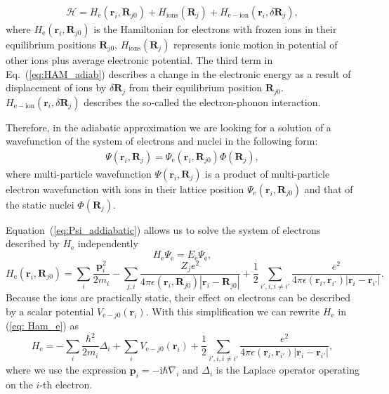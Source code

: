 \begin{eqnarray}
\mathcal{H}=H_\mathrm{e}\left(\mathbf{r}_i,\mathbf{R}_{j0}\right)+H_{\mathrm{ions}}\left(\mathbf{R}_j\right)+H_{\mathrm{e-ion}}\left(\mathbf{r}_i,\delta\mathbf{R}_{j}\right),\label{eq:HAM_adiab}
\end{eqnarray}
%
where $H_\mathrm{e}\left(\mathbf{r}_i,\mathbf{R}_{j0}\right)$ is the Hamiltonian for electrons with frozen ions in their equilibrium positions $\mathbf{R}_{j0}$, $H_{\mathrm{ions}}\left(\mathbf{R}_j\right)$ represents ionic motion in potential of other ions plus average electronic potential. The third term in Eq.~(\ref{eq:HAM_adiab}) describes a change in the electronic energy as a result of displacement of ions by $\delta\mathbf{R}_{j}$ from their equilibrium position $\mathbf{R}_{j0}$. $H_{\mathrm{e-ion}}\left(\mathbf{r}_i,\delta\mathbf{R}_{j}\right)$ describes the so-called the electron-phonon interaction.

Therefore, in the adiabatic approximation we are looking for a solution of a wavefunction of the system of electrons and nuclei in the following form:
%
\begin{eqnarray}
\Psi\left(\mathbf{r}_i, \mathbf{R}_{j}\right)=\Psi_\mathrm{e}\left(\mathbf{r}_i,\mathbf{R}_{j0}\right)\Phi\left(\mathbf{R}_j\right),\label{eq:Psi_addiabatic}
\end{eqnarray}
%
where multi-particle wavefunction $\Psi\left(\mathbf{r}_i, \mathbf{R}_{j}\right)$ is a product of multi-particle electron wavefunction with ions in their lattice position $\Psi_\mathrm{e}\left(\mathbf{r}_i,\mathbf{R}_{j0}\right)$ and that of the static nuclei $\Phi\left(\mathbf{R}_j\right)$.

Equation~(\ref{eq:Psi_addiabatic}) allows us to solve the system of electrons described by $H_\mathrm{e}$ independently
\begin{equation}
H_\mathrm{e}\Psi_\mathrm{e}=E_\mathrm{e}\Psi_\mathrm{e},
\end{equation}
\begin{equation}
H_\mathrm{e}\left(\mathbf{r}_i,\mathbf{R}_{j0}\right)=\sum_{i} \frac{\mathbf{p}_i^2}{2m_i}- \sum_{j, i} \frac{Z_j e^2}{4\pi \epsilon(\mathbf{r}_i, \mathbf{R}_{j0}) |\mathbf{r}_i-\mathbf{R}_{j0}|} + \frac{1}{2}\sum_{i', i, i\neq i'} \frac{e^2}{4\pi \epsilon(\mathbf{r}_i, \mathbf{r}_{i'})  |\mathbf{r}_i-\mathbf{r}_{i'}|} .\label{eq: Ham_e}
\end{equation}
%
Because the ions are practically static, their effect on electrons can be described by a scalar potential $V_{\mathrm{e}-j0}\left(\mathbf{r}_i\right)$. With this simplification we can rewrite $H_\mathrm{e}$ in (\ref{eq: Ham_e}) as
\begin{equation}
H_\mathrm{e}=-\sum_{i} \frac{\hbar^2}{2m_i}\Delta_i+\sum_i V_{\mathrm{e}-j0}\left(\mathbf{r}_i\right) + \frac{1}{2}\sum_{i', i, i\neq i'} \frac{e^2}{4\pi \epsilon(\mathbf{r}_i, \mathbf{r}_{i'})  |\mathbf{r}_i-\mathbf{r}_{i'}|},\label{eq: Ham_e2}
\end{equation}
where we use the expression $\mathbf{p}_i=-\mathrm{i}\hbar\nabla_i$ and $\Delta_i$ is the Laplace operator operating on the $i$-th electron.



